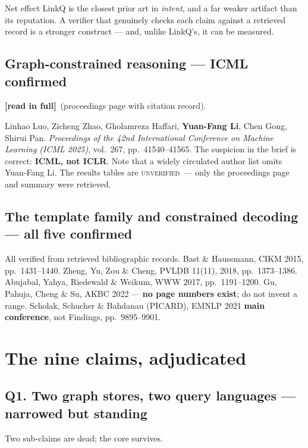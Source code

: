 \documentclass[11pt,a4paper]{article}
\newcommand{\vstanding}{\textcolor{standing}{\textbf{narrowed but standing}}}
\newcommand{\readtag}{\textcolor{standing}{\textbf{[read in full]}}}
\newcommand{\unver}{\textcolor{killed}{\textsc{unverified}}}
\begin{document}
\begin{keybox}{Net effect}
LinkQ is the closest prior art in \emph{intent}, and a far weaker artifact than its
reputation. A verifier that genuinely checks each claim against a retrieved record
is a stronger construct --- and, unlike LinkQ's, it can be measured.
\end{keybox}

\subsection{Graph-constrained reasoning --- ICML confirmed}

\readtag\ (proceedings page with citation record).

Linhao Luo, Zicheng Zhao, Gholamreza Haffari, \textbf{Yuan-Fang Li}, Chen Gong,
Shirui Pan. \emph{Proceedings of the 42nd International Conference on Machine
Learning (ICML 2025)}, vol.~267, pp.~41540--41565. The suspicion in the brief is
correct: \textbf{ICML, not ICLR}. Note that a widely circulated author list omits
Yuan-Fang Li. The results tables are \unver\ --- only the proceedings page and
summary were retrieved.

\subsection{The template family and constrained decoding --- all five confirmed}

All verified from retrieved bibliographic records. Bast \& Haussmann, CIKM 2015,
pp.~1431--1440. Zheng, Yu, Zou \& Cheng, PVLDB 11(11), 2018, pp.~1373--1386.
Abujabal, Yahya, Riedewald \& Weikum, WWW 2017, pp.~1191--1200. Gu, Pahuja, Cheng
\& Su, AKBC 2022 --- \textbf{no page numbers exist}; do not invent a range.
Scholak, Schucher \& Bahdanau (PICARD), EMNLP 2021 \textbf{main conference}, not
Findings, pp.~9895--9901.

\newpage
\section{The nine claims, adjudicated}

\subsection{Q1. Two graph stores, two query languages --- \texorpdfstring{\vstanding}{narrowed but standing}}

Two sub-claims are dead; the core survives.
\end{document}
